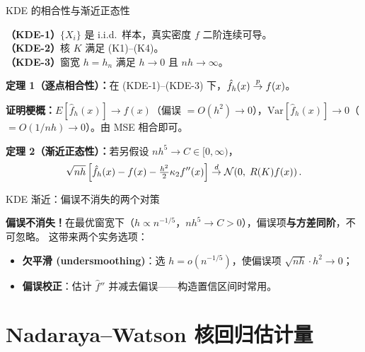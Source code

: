 \documentclass[aspectratio=169, 10pt]{beamer}
\begin{document}
\begin{frame}{KDE 的相合性与渐近正态性}

  \begin{assumptionbox}
    \textbf{（KDE-1）}$\{X_i\}$ 是 i.i.d.\ 样本，真实密度 $f$ 二阶连续可导。\\
    \textbf{（KDE-2）}核 $K$ 满足 (K1)--(K4)。\\
    \textbf{（KDE-3）}窗宽 $h = h_n$ 满足 $h\to 0$ 且 $nh\to\infty$。
  \end{assumptionbox}

  \begin{highlightbox}
    \textbf{定理 1（逐点相合性）：}在 (KDE-1)--(KDE-3) 下，$\hat f_h(x) \overset{p}{\to} f(x)$。

    \textbf{证明梗概：}$E[\hat f_h(x)]\to f(x)$（偏误 $=O(h^2)\to 0$），$\text{Var}[\hat f_h(x)]\to 0$（$=O(1/nh)\to 0$）。由 MSE 相合即可。

    \textbf{定理 2（渐近正态性）：}若另假设 $nh^5\to C\in[0,\infty)$，
    \[
      \sqrt{nh}\left[\hat f_h(x) - f(x) - \tfrac{h^2}{2}\kappa_2 f''(x)\right]
      \overset{d}{\to} \mathcal{N}\!\left(0,\; R(K) f(x)\right).
    \]
  \end{highlightbox}

\end{frame}


\begin{frame}{KDE 渐近：偏误不消失的两个对策}

  \begin{keybox}
    \textbf{偏误不消失！}在最优窗宽下（$h\propto n^{-1/5}$，$nh^5\to C>0$），偏误项\textbf{与方差同阶}，不可忽略。
    这带来两个实务选项：
    \begin{itemize}
      \item \textbf{欠平滑 (undersmoothing)}：选 $h = o(n^{-1/5})$，使偏误项 $\sqrt{nh}\cdot h^2 \to 0$；
      \item \textbf{偏误校正}：估计 $\hat f''$ 并减去偏误——构造置信区间时常用。
    \end{itemize}
  \end{keybox}

\end{frame}



\section{Nadaraya--Watson 核回归估计量}
\end{document}
